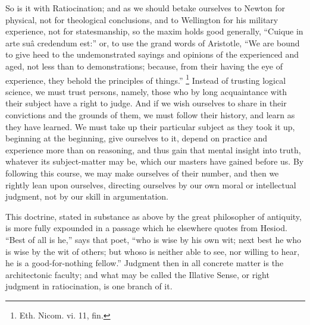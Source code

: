 So is it with Ratiocination; and as we should betake ourselves to
Newton for physical, not for theological conclusions, and to
Wellington for his military experience, not for statesmanship, so the
maxim holds good generally, ``Cuique in arte suâ credendum est:''
or, to use the grand words of Aristotle, ``We are bound to give
heed to the undemonstrated sayings and opinions of the experienced and
aged, not less than to demonstrations; because, from their having the
eye of experience, they behold the principles of things.'' \footnote{Eth. Nicom. vi.
11, fin.} Instead of trusting logical science, we must trust
persons, namely, those who by long acquaintance with their subject
have a right to judge. And if we wish ourselves to share in their
convictions and the grounds of them, we must follow their history, and
learn as they have learned. We must take up their particular subject
as they took it up, beginning at the beginning, give ourselves to it,
depend on practice and experience more than on reasoning, and thus
gain that mental insight into truth, whatever its subject-matter may
be, which our masters have gained before us. By following this course,
we may make ourselves of their number, and then we rightly lean upon
ourselves, directing ourselves by our own moral or intellectual
judgment, not by our skill in argumentation.

This doctrine, stated in substance as above by the great
philosopher of antiquity, is more fully expounded in a passage which
he elsewhere quotes from Hesiod. ``Best of all is he,'' says
that poet, ``who is wise by his own wit; next best he who is wise
by the wit of others; but whoso is neither able to see, nor willing to
hear, he is a good-for-nothing fellow.'' Judgment then in all
concrete matter is the architectonic faculty; and what may be called
the Illative Sense, or right judgment in ratiocination, is one branch
of it.


